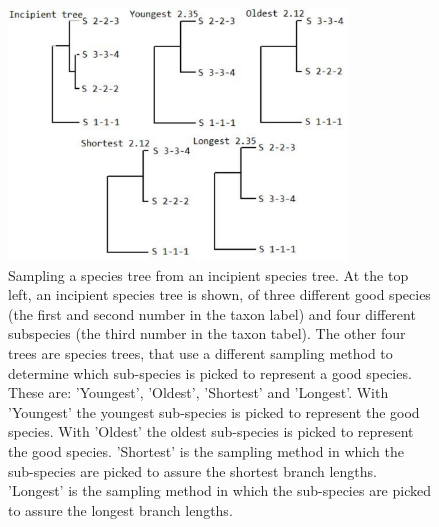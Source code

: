 \documentclass{article}
\newcommand*\richel[1]{\textcolor{orange}{\textbf{[RJCB: #1]}}}
\begin{document}





\appendix

\begin{figure}[!htbp]
  \includegraphics[width=0.8\textwidth]{fig_sampling_methods.png}
  \caption{
    Sampling a species tree from an incipient species tree. At the top left,
    an incipient species tree is shown, of three different good species (the
    first and second number in the taxon label) and four different subspecies (the
    third number in the taxon tabel). The other four trees are species trees,
    that use a different sampling method to determine which sub-species is picked to
    represent a good species. These are: 'Youngest', 'Oldest', 'Shortest' and
    'Longest'. With 'Youngest' the youngest sub-species is picked to represent the
    good species. With 'Oldest' the oldest sub-species is picked to represent the
    good species. 'Shortest' is the sampling method in which the sub-species are
    picked to assure the shortest branch lengths. 'Longest' is the sampling method 
    in which the sub-species are picked to assure the longest branch lengths.
  }
\end{figure}
\end{document}
